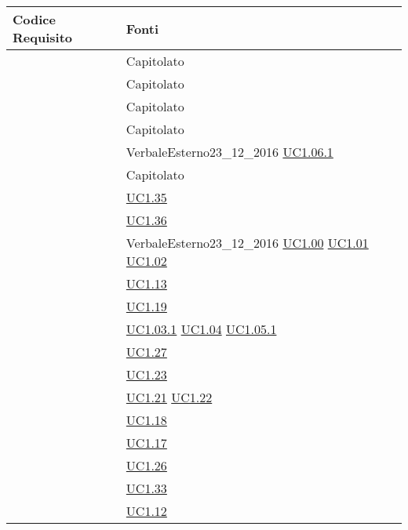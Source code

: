 \begin{longtable}{|P{6cm}|P{6cm}|}
	\hline \textbf{Codice Requisito} & \textbf{Fonti}\\
	\hline {} & Capitolato \\
	\hline {} & Capitolato \\
	\hline {} & Capitolato \\
	\hline {} & Capitolato \\
	\hline {} & VerbaleEsterno23\_12\_2016 \linebreak \hyperref[UC1.06.1]{UC1.06.1}  \\	
	\hline {} & Capitolato \\
	\hline {} & \hyperref[UC1.35]{UC1.35} \\
	\hline {} & \hyperref[UC1.36]{UC1.36} \\
	\hline {} & VerbaleEsterno23\_12\_2016 \linebreak \hyperref[UC1.00]{UC1.00} \linebreak \hyperref[UC1.01]{UC1.01} \linebreak \hyperref[UC1.02]{UC1.02} \\
	\hline {} & \hyperref[UC1.13]{UC1.13} \\
	\hline {} & \hyperref[UC1.19]{UC1.19} \\
	\hline {} & \hyperref[UC1.03.1]{UC1.03.1} \linebreak \hyperref[UC1.04]{UC1.04} \linebreak \hyperref[UC1.05.1]{UC1.05.1} \\
	\hline {} & \hyperref[UC1.27]{UC1.27} \\
	\hline {} & \hyperref[UC1.23]{UC1.23} \\
	\hline {} & \hyperref[UC1.21]{UC1.21} \linebreak \hyperref[UC1.22]{UC1.22} \\
	\hline {} & \hyperref[UC1.18]{UC1.18} \\
	\hline {} & \hyperref[UC1.17]{UC1.17} \\
	\hline {} & \hyperref[UC1.26]{UC1.26} \\
	\hline {} & \hyperref[UC1.33]{UC1.33} \\
	\hline {} & \hyperref[UC1.12]{UC1.12} \\

\end{longtable}
